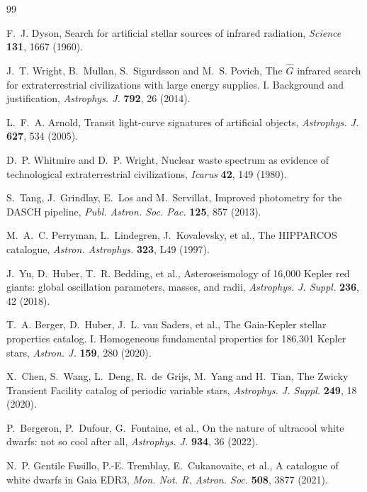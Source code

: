 \documentclass[3p,11pt]{elsarticle}
\begin{document}
\begin{thebibliography}{99}\small\raggedright
\setlength{\itemsep}{1pt}

F.~J. Dyson, Search for artificial stellar sources of infrared radiation, \emph{Science}
\textbf{131}, 1667 (1960).

J.~T. Wright, B.~Mullan, S.~Sigurdsson and M.~S. Povich, The $\hat{G}$ infrared search for
extraterrestrial civilizations with large energy supplies. I. Background and
justification, \emph{Astrophys. J.} \textbf{792}, 26 (2014).

L.~F.~A. Arnold, Transit light-curve signatures of artificial objects, \emph{Astrophys.
J.} \textbf{627}, 534 (2005).

D.~P. Whitmire and D.~P. Wright, Nuclear waste spectrum as evidence of technological
extraterrestrial civilizations, \emph{Icarus} \textbf{42}, 149 (1980).

S.~Tang, J.~Grindlay, E.~Los and M.~Servillat, Improved photometry for the DASCH pipeline,
\emph{Publ. Astron. Soc. Pac.} \textbf{125}, 857 (2013).

M.~A.~C. Perryman, L.~Lindegren, J.~Kovalevsky, et al., The HIPPARCOS catalogue,
\emph{Astron. Astrophys.} \textbf{323}, L49 (1997).

J.~Yu, D.~Huber, T.~R. Bedding, et al., Asteroseismology of 16,000 Kepler red giants:
global oscillation parameters, masses, and radii, \emph{Astrophys. J. Suppl.}
\textbf{236}, 42 (2018).

T.~A. Berger, D.~Huber, J.~L. van Saders, et al., The Gaia-Kepler stellar properties
catalog. I. Homogeneous fundamental properties for 186,301 Kepler stars, \emph{Astron.
J.} \textbf{159}, 280 (2020).

X.~Chen, S.~Wang, L.~Deng, R.~de~Grijs, M.~Yang and H.~Tian, The Zwicky Transient Facility
catalog of periodic variable stars, \emph{Astrophys. J. Suppl.} \textbf{249}, 18 (2020).

P.~Bergeron, P.~Dufour, G.~Fontaine, et al., On the nature of ultracool white dwarfs:
not so cool after all, \emph{Astrophys. J.} \textbf{934}, 36 (2022).

N.~P. Gentile Fusillo, P.-E. Tremblay, E.~Cukanovaite, et al., A catalogue of white dwarfs
in Gaia EDR3, \emph{Mon. Not. R. Astron. Soc.} \textbf{508}, 3877 (2021).


\end{thebibliography}
\end{document}
